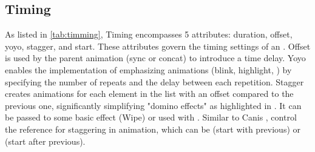 \subsection{Timing}
\label{ssec:gaia_ani_timing}
\begin{table}[]
	\caption{Timing attributes}
	\vspace{-3mm}
	\label{tab:timming}
	\vspace{-1mm}
\end{table}
As listed in \autoref{tab:timming}, Timing encompasses 5 attributes: duration, offset, yoyo, stagger, and start.
These attributes govern the timing settings of an \aniunit{}.
Offset is used by the parent animation (\eg sync or concat) to introduce a time delay.
Yoyo enables the implementation of emphasizing animations (\eg blink, highlight, \etcns) by specifying the number of repeats and the delay between each repetition.
Stagger creates animations for each element in the list with an offset compared to the previous one, significantly simplifying "domino effects" as highlighted in \cite{shi2021communicating}.
It can be passed to some basic effect (\eg Wipe) or used with .
Similar to Canis \cite{ge2020canis},  control the reference for staggering in  animation, which can be  (start with previous) or  (start after previous).

